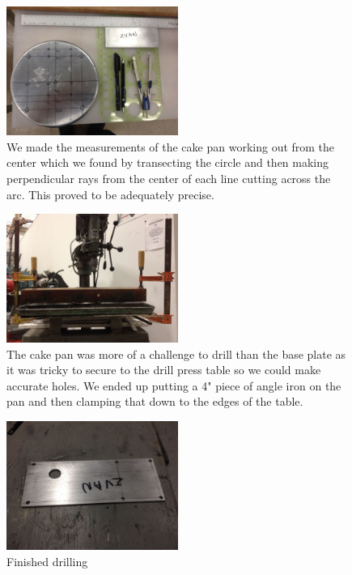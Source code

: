\documentclass[11pt]{article} %
\begin{document}
\begin{figure}
  \centering
  \caption{ We made the measurements of the cake pan working out from the center which we found by transecting the circle and then making perpendicular rays from the center of each line cutting across the arc. This proved to be adequately precise. }
  \includegraphics[width=0.50\textwidth]{feed/04.jpeg}
\end{figure}



\begin{figure}
  \centering
  \caption{ The cake pan was more of a challenge to drill than the base plate as it was tricky to secure to the drill press table so we could make accurate holes. We ended up putting a 4" piece of angle iron on the pan and then clamping that down to the edges of the table.  }
  \includegraphics[width=0.50\textwidth]{feed/05.jpeg}
\end{figure}



\begin{figure}
  \centering
  \caption{ Finished drilling }
  \includegraphics[width=0.50\textwidth]{feed/06.jpeg}
\end{figure}
\end{document}
